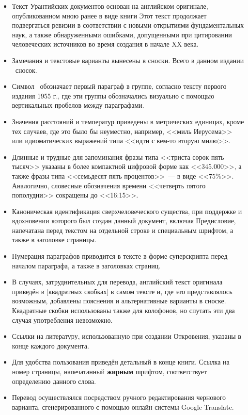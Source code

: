\begin{itemize}
\item Текст Урантийских документов основан на английском оригинале, опубликованном мною ранее в виде книги
      Этот текст продолжает подвергаться ревизии в соответствии с новыми открытиями фундаментальных наук, а также обнаруженными
      ошибками, допущенными при цитировании человеческих источников во время создания
       в начале XX века.
\item Замечания и текстовые варианты вынесены в сноски. Всего в данном издании \totalnfnsts\ сносок.
\item Символ \pc\ обозначает первый параграф в группе, согласно тексту первого издания 1955 г., где эти группы обозначались визуально с помощью вертикальных пробелов между параграфами.
\item Значения расстояний и температур приведены в метрических единицах, кроме тех случаев, где это было бы неуместно,
      например, <<миль Иерусема>> или идиоматических выражений типа <<идти с кем-то вторую милю>>.
\item Длинные и трудные для запоминания фразы типа <<триста сорок пять тысяч>> указаны в более компактной цифровой
      форме как <<345.000>>, а также фразы типа <<семьдесят пять процентов>>~--- в виде <<75\%>>.
      Аналогично, словесные обозначения времени <<четверть пятого пополудни>> сокращены до <<16:15>>.
\item Каноническая идентификация сверхчеловеческого существа, при поддержке и вдохновении которого был создан данный документ,
      включая Предисловие, напечатана перед текстом на отдельной строке и специальным шрифтом, а также в заголовке страницы.
\item Нумерация параграфов приводится в тексте в форме суперскрипта перед началом параграфа, а также в заголовках страниц.
\item В случаях, затруднительных для перевода, английский текст оригинала приведён в
      [квадратных скобках] в самом тексте и, где это представлялось возможным,
      добавлены пояснения и альтернативные варианты в сноске.
      Квадратные скобки использованы также для колофонов, но спутать эти два случая употребления невозможно.
\item Ссылки на литературу, использованную при создании Откровения, указаны в конце каждого документа.
\item Для удобства пользования приведён детальный  в конце книги.
      Ссылка на номер страницы, напечатанный \textbf{жирным} шрифтом, соответствует определению данного слова.
\item Перевод осуществлялся посредством ручного редактирования чернового варианта, сгенерированного с помощью онлайн системы
      Google Translate.
\end{itemize}


